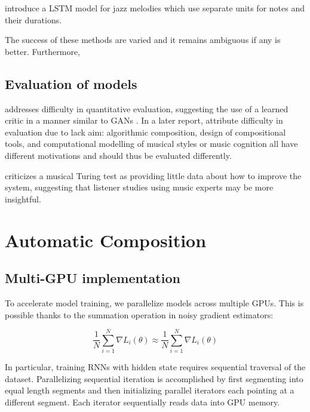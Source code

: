 \cite{franklin2005jazz} introduce a LSTM model for jazz melodies which use
separate units for notes and their durations.

The success of these methods are varied and it remains ambiguous if any
is better. Furthermore,

\subsection{Evaluation of models}

\cite{pearce2001towards} addresses difficulty in quantitative evaluation,
suggesting the use of a learned critic in a manner similar to GANs
\cite{goodfellow2014generative}. In a later report,
\cite{pearce2002motivations} attribute difficulty in evaluation due to lack
aim: algorithmic composition, design of compositional tools, and computational
modelling of musical styles or music cognition all have different motivations
and should thus be evaluated differently.

\cite{ariza2009interrogator} criticizes a musical Turing test as providing little data about
how to improve the system, suggesting that listener studies using music experts
may be more insightful.

\section{Automatic Composition}

\subsection{Multi-GPU implementation}

To accelerate model training, we parallelize models across multiple GPUs. This is possible
thanks to the summation operation in noisy gradient estimators:

\begin{equation}
  \frac{1}{N} \sum_{i=1}^N \nabla L_i(\theta) \approx \frac{1}{N} \sum_{i=1}^N \nabla L_i(\theta)
\end{equation}

In particular, training RNNs with hidden state requires sequential traversal
of the dataset. Parallelizing sequential iteration is accomplished by first segmenting
into equal length segments and then initializing parallel iterators each
pointing at a different segment. Each iterator sequentially reads data
into GPU memory.

